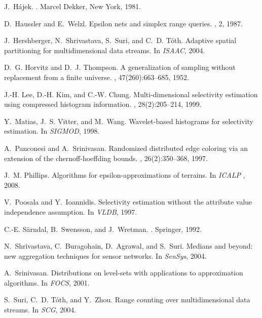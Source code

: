 \documentclass[11pt]{article}
\begin{document}
{\begin{thebibliography}{10}
J.~H{\'a}jek.
.
\newblock Marcel Dekker, New York, 1981.

D.~Haussler and E.~Welzl.
\newblock Epsilon nets and simplex range queries.
, 2, 1987.

J.~Hershberger, N.~Shrivastava, S.~Suri, and C.~D. T{\'o}th.
\newblock Adaptive spatial partitioning for multidimensional data streams.
\newblock In {\em ISAAC}, 2004.

D.~G. Horvitz and D.~J. Thompson.
\newblock A generalization of sampling without replacement from a finite
  universe.
, 47(260):663--685, 1952.

J.-H. Lee, D.-H. Kim, and C.-W. Chung.
\newblock Multi-dimensional selectivity estimation using compressed histogram
  information.
, 28(2):205--214, 1999.

Y.~Matias, J.~S. Vitter, and M.~Wang.
\newblock Wavelet-based histograms for selectivity estimation.
\newblock In {\em SIGMOD}, 1998.

A.~Panconesi and A.~Srinivasan.
\newblock Randomized distributed edge coloring via an extension of the
  chernoff-hoeffding bounds.
, 26(2):350--368, 1997.

J.~M. Phillips.
\newblock Algorithms for epsilon-approximations of terrains.
\newblock In {\em ICALP }, 2008.

V.~Poosala and Y.~Ioannidis.
\newblock Selectivity estimation without the attribute value independence
  assumption.
\newblock In {\em VLDB},  1997.

C.-E. S\"{a}rndal, B.~Swensson, and J.~Wretman.
.
\newblock Springer, 1992.

N.~Shrivastava, C.~Buragohain, D.~Agrawal, and S.~Suri.
\newblock Medians and beyond: new aggregation techniques for sensor networks.
\newblock In {\em SenSys}, 2004.

A.~Srinivasan.
\newblock Distributions on level-sets with applications to approximation
  algorithms.
\newblock In {\em FOCS}, 2001.

S.~Suri, C.~D. T\'{o}th, and Y.~Zhou.
\newblock Range counting over multidimensional data streams.
\newblock In {\em SCG}, 2004.


\end{thebibliography}}
\end{document}

